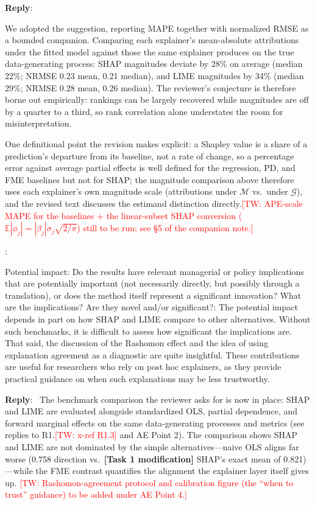\documentclass[11pt]{article}
\newcommand{\tw}[1]{\textcolor{red}{[TW: #1]}}
\newcounter{se}[section]
\newcounter{reviewer}
\newcounter{point}[reviewer]
\renewcommand{\thepoint}{R\,\thereviewer.\arabic{point}}
\newenvironment{point}{
    \refstepcounter{point} \bigskip \noindent {\textbf{\thepoint}}: \rmfamily \itshape
}{\medskip}
\newenvironment{reply}
 {\par\medskip \noindent \begin{sf}\textbf{Reply}:\ }
 {\medskip \end{sf}}
\begin{document}
\begin{reply}
{\color{red}
We adopted the suggestion, reporting MAPE together with normalized RMSE as a bounded companion. Comparing each explainer's mean-absolute attributions under the fitted model against those the same explainer produces on the true data-generating process: SHAP magnitudes deviate by 28\% on average (median 22\%; NRMSE 0.23 mean, 0.21 median), and LIME magnitudes by 34\% (median 29\%; NRMSE 0.28 mean, 0.26 median). The reviewer's conjecture is therefore borne out empirically: rankings can be largely recovered while magnitudes are off by a quarter to a third, so rank correlation alone understates the room for misinterpretation.

One definitional point the revision makes explicit: a Shapley value is a share of a prediction's departure from its baseline, not a rate of change, so a percentage error against average partial effects is well defined for the regression, PD, and FME baselines but not for SHAP; the magnitude comparison above therefore uses each explainer's own magnitude scale (attributions under $\mathcal{M}$ vs.\ under $\mathcal{G}$), and the revised text discusses the estimand distinction directly.\tw{APE-scale MAPE for the baselines + the linear-subset SHAP conversion ($\mathbb{E}|\phi_j| = |\beta_j|\sigma_j\sqrt{2/\pi}$) still to be run; see \S5 of the companion note.}
}
\end{reply}


\begin{point}
Potential impact: Do the results have relevant managerial or policy implications that are potentially important (not necessarily directly, but possibly through a translation), or does the method itself represent a significant innovation? What are the implications? Are they novel and/or significant?: The potential impact depends in part on how SHAP and LIME compare to other alternatives. Without such benchmarks, it is difficult to assess how significant the implications are. That said, the discussion of the Rashomon effect and the idea of using explanation agreement as a diagnostic are quite insightful. These contributions are useful for researchers who rely on post hoc explainers, as they provide practical guidance on when such explanations may be less trustworthy.
\end{point}

\begin{reply}
{\color{red}
The benchmark comparison the reviewer asks for is now in place: SHAP and LIME are evaluated alongside standardized OLS, partial dependence, and forward marginal effects on the same data-generating processes and metrics (see replies to R1.\tw{x-ref R1.3} and AE Point 2). The comparison shows SHAP and LIME are not dominated by the simple alternatives---naive OLS aligns far worse (0.758 direction vs.\ {\color{blue}\textbf{[Task 1 modification]} SHAP's exact mean of 0.821})---while the FME contrast quantifies the alignment the explainer layer itself gives up. \tw{Rashomon-agreement protocol and calibration figure (the ``when to trust'' guidance) to be added under AE Point 4.}
}
\end{reply}
\end{document}
